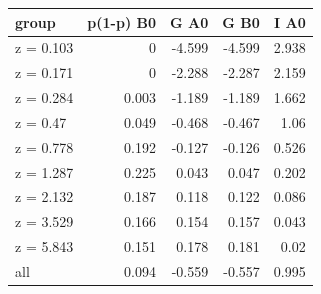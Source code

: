 \begin{tabular}{lrrrr}
\toprule
group & p(1-p) B0 & G A0 & G B0 & I A0 \\
\midrule
z = 0.103 & 0 & -4.599 & -4.599 & 2.938 \\
z = 0.171 & 0 & -2.288 & -2.287 & 2.159 \\
z = 0.284 & 0.003 & -1.189 & -1.189 & 1.662 \\
z = 0.47 & 0.049 & -0.468 & -0.467 & 1.06 \\
z = 0.778 & 0.192 & -0.127 & -0.126 & 0.526 \\
z = 1.287 & 0.225 & 0.043 & 0.047 & 0.202 \\
z = 2.132 & 0.187 & 0.118 & 0.122 & 0.086 \\
z = 3.529 & 0.166 & 0.154 & 0.157 & 0.043 \\
z = 5.843 & 0.151 & 0.178 & 0.181 & 0.02 \\
all & 0.094 & -0.559 & -0.557 & 0.995 \\
\bottomrule
\end{tabular}
